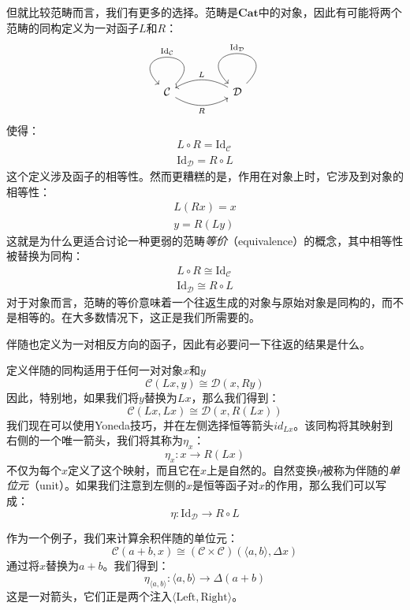 \documentclass[DaoFP]{subfiles}
\begin{document}
    但就比较范畴而言，我们有更多的选择。范畴是$\mathbf{Cat}$中的对象，因此有可能将两个范畴的同构定义为一对函子$L$和$R$：
    \[
        \begin{tikzcd}
            \mathcal{C}
            \arrow[rr, bend right, "R"']
            \arrow[loop, "\text{Id}_{ \mathcal{C}} "']
            &&
            \mathcal{D}
            \arrow[ll, bend right, "L"']
            \arrow[loop, "\text{Id}_{ \mathcal{D}} "']
        \end{tikzcd}
    \]
    使得：
    \begin{align*}
        L \circ R = \text{Id}_{ \mathcal{C}} \\
        \text{Id}_{ \mathcal{D}} = R \circ L
    \end{align*}
    这个定义涉及函子的相等性。然而更糟糕的是，作用在对象上时，它涉及到对象的相等性：
    \begin{align*}
        L (R x) = x \\
        y = R (L y)
    \end{align*}
    这就是为什么更适合讨论一种更弱的范畴\emph{等价}（equivalence）的概念，其中相等性被替换为同构：
    \begin{align*}
        L \circ R \cong \text{Id}_{ \mathcal{C}} \\
        \text{Id}_{ \mathcal{D}} \cong R \circ L
    \end{align*}
    对于对象而言，范畴的等价意味着一个往返生成的对象与原始对象是同构的，而不是相等的。在大多数情况下，这正是我们所需要的。

    伴随也定义为一对相反方向的函子，因此有必要问一下往返的结果是什么。

    定义伴随的同构适用于任何一对对象$x$和$y$
    \[  \mathcal{C} (L x, y) \cong \mathcal{D}( x , R y)\]
    因此，特别地，如果我们将$y$替换为$L x$，那么我们得到：
    \[  \mathcal{C} (L x, L x) \cong \mathcal{D}( x , R (L x))\]
    我们现在可以使用Yoneda技巧，并在左侧选择恒等箭头$id_{L x}$。该同构将其映射到右侧的一个唯一箭头，我们将其称为$\eta_x$：
    \[ \eta_x \colon x \to R ( L x) \]
    不仅为每个$x$定义了这个映射，而且它在$x$上是自然的。自然变换$\eta$被称为伴随的\emph{单位元}（unit）。如果我们注意到左侧的$x$是恒等函子对$x$的作用，那么我们可以写成：
    \[ \eta \colon \text{Id}_{\mathcal{D}} \to R \circ L \]

    作为一个例子，我们来计算余积伴随的单位元：
    \[  \mathcal{C} (a + b, x) \cong (\mathcal{C} \times \mathcal{C})( \langle a, b \rangle , \Delta x)\]
    通过将$x$替换为$a + b$。我们得到：
    \[ \eta_{\langle a, b \rangle} \colon \langle a, b \rangle \to \Delta(a + b) \]
    这是一对箭头，它们正是两个注入$\langle \text{Left}, \text{Right} \rangle$。
\end{document}
